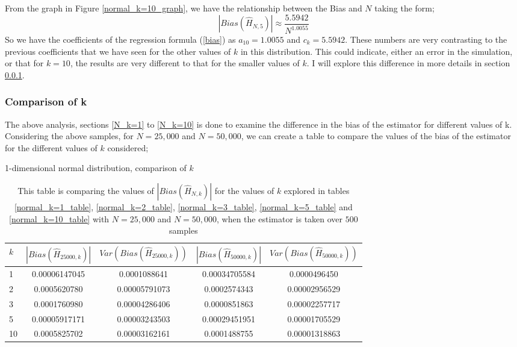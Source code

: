 \documentclass{article}
\begin{document}
From the graph in Figure \ref{normal_k=10_graph}, we have the relationship between the Bias and $N$ taking the form;
\begin{equation}
|Bias(\hat{H}_{N, 5})| \approx \frac{5.5942}{N^{1.0055}} \nonumber
\end{equation}
So we have the coefficients of the regression formula (\ref{bias}) as $a_{10} = 1.0055$ and $c_{k} = 5.5942$. These numbers are very contrasting to the previous coefficients that we have seen for the other values of $k$ in this distribution. This could indicate, either an error in the simulation, or that for $k=10$, the results are very different to that for the smaller values of $k$. I will explore this difference in more details in section \ref{N_compare_k}.




\subsubsection{Comparison of k} \label{N_compare_k}
The above analysis, sections \ref{N_k=1} to \ref{N_k=10} is done to examine the difference in the bias of the estimator for different values of k. Considering the above samples, for $N=25,000$ and $N=50,000$, we can create a table to compare the values of the bias of the estimator for the different values of $k$ considered;

\begin{table}
\caption{1-dimensional normal distribution, comparison of $k$} \label{normal_kcompare_table}
\begin{center}
\begin{tabular}{| l | c c c c|} 
\toprule
$k$ & $|Bias(\hat{H}_{25000, k})|$ & $Var(Bias(\hat{H}_{25000, k}))$ & $|Bias(\hat{H}_{50000, k})|$ & $Var(Bias(\hat{H}_{50000, k}) )$ \\
\midrule[1pt]
1    & 0.00006147045   & 0.0001088641     & 0.00034705584   & 0.0000496450   \\
2    & 0.0005620780     & 0.00005791073   & 0.0002574343     & 0.00002956529 \\
3    & 0.0001760980     & 0.00004286406   & 0.0000851863     & 0.00002257717 \\
5    & 0.00005917171   & 0.00003243503   & 0.00029451951   & 0.00001705529 \\
10  & 0.0005825702     & 0.00003162161   & 0.0001488755     & 0.00001318863 \\
\hline
\end{tabular}
\\[10pt]
\caption*{This table is comparing the values of $|Bias(\hat{H}_{N, k})|$ for the values of $k$ explored in tables \ref{normal_k=1_table}, \ref{normal_k=2_table}, \ref{normal_k=3_table}, \ref{normal_k=5_table} and  \ref{normal_k=10_table} with $N=25,000$ and $N=50,000$, when the estimator is taken over $500$ samples}
\end{center}
\end{table}
\end{document}
